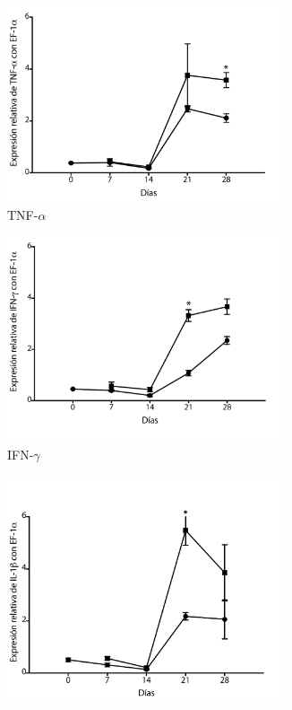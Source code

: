 \documentclass[12pt,letterpaper,oneside]{scrbook}
\begin{document}
\begin{figure}[h!]
    \begin{subfigure}{0.5\textwidth}
        \includegraphics[width=0.9\textwidth]{eps/qPCR/pdf/qtnfa}
        \caption{TNF-$\alpha$}
        \label{fig:qpcr:tnfa}
        \end{subfigure}
    \begin{subfigure}{0.5\textwidth}
        \includegraphics[width=0.9\textwidth]{eps/qPCR/pdf/qifng}
        \caption{IFN-$\gamma$}
        \label{fig:qpcr:ifng}
    \end{subfigure}
    \begin{subfigure}{0.5\textwidth}
        \includegraphics[width=0.9\textwidth]{eps/qPCR/pdf/qil1b}

\end{subfigure}
\end{figure}
\end{document}
